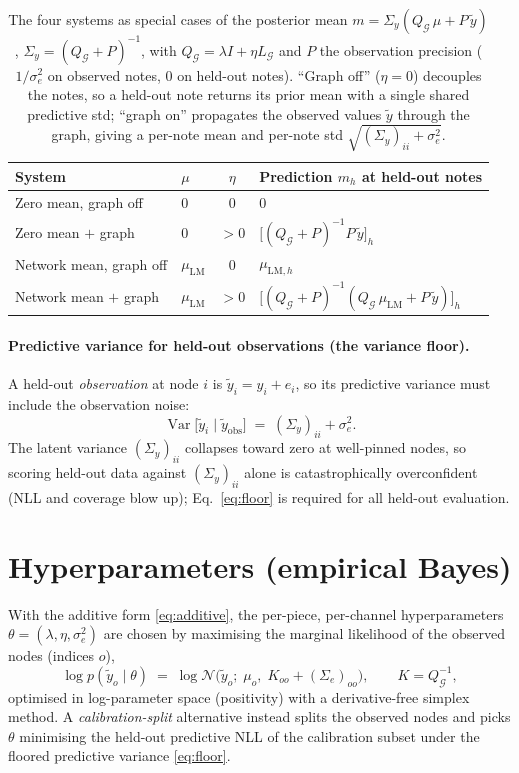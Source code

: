 \documentclass[11pt,a4paper]{report}
\newcommand{\N}{\mathcal{N}}
\newcommand{\graph}{\mathcal{G}}
\newcommand{\Qg}{Q_{\graph}}
\newcommand{\Lg}{L_{\graph}}
\newcommand{\muLM}{\mu_{\mathrm{LM}}}  %
\newcommand{\Sy}{\Sigma_y}             %
\begin{document}
\begin{table}[h]\centering
\caption{The four systems as special cases of the posterior mean
$m = \Sy(\Qg\,\mu + P\,\tilde y)$, $\Sy = (\Qg + P)^{-1}$, with
$\Qg = \lambda I + \eta\Lg$ and $P$ the observation precision ($1/\sigma_e^2$ on
observed notes, $0$ on held-out notes). ``Graph off'' ($\eta = 0$) decouples the
notes, so a held-out note returns its prior mean with a single shared predictive
std; ``graph on'' propagates the observed values $\tilde y$ through the graph,
giving a per-note mean and per-note std $\sqrt{(\Sy)_{ii} + \sigma_e^2}$.}
\label{tab:system-posteriors}
\begin{tabular}{@{}llcl@{}}
\toprule
System & $\mu$ & $\eta$ & Prediction $m_h$ at held-out notes \\
\midrule
Zero mean, graph off     & $0$     & $0$   & $0$ \\
Zero mean $+$ graph      & $0$     & $>0$  & $\bigl[(\Qg+P)^{-1}P\,\tilde y\bigr]_h$ \\
Network mean, graph off  & $\muLM$ & $0$   & $\mu_{\mathrm{LM},h}$ \\
Network mean $+$ graph    & $\muLM$ & $>0$  & $\bigl[(\Qg+P)^{-1}(\Qg\,\muLM+P\,\tilde y)\bigr]_h$ \\
\bottomrule
\end{tabular}
\end{table}

\paragraph{Predictive variance for held-out observations (the variance floor).}
A held-out \emph{observation} at node $i$ is $\tilde y_i = y_i + e_i$, so its
predictive variance must include the observation noise:
\begin{equation}
  \operatorname{Var}\bigl[\tilde y_i \mid \tilde y_{\mathrm{obs}}\bigr]
  \;=\; (\Sy)_{ii} + \sigma_e^2 .
  \label{eq:floor}
\end{equation}
The latent variance $(\Sy)_{ii}$ collapses toward zero at well-pinned nodes, so
scoring held-out data against $(\Sy)_{ii}$ alone is catastrophically overconfident
(NLL and coverage blow up); Eq.~\eqref{eq:floor} is required for all held-out
evaluation.

\section{Hyperparameters (empirical Bayes)}
\label{sec:eb}
With the additive form \eqref{eq:additive}, the per-piece, per-channel
hyperparameters $\theta = (\lambda, \eta, \sigma_e^2)$ are chosen by maximising the
marginal likelihood of the observed nodes (indices $o$),
\begin{equation}
  \log p(\tilde y_o \mid \theta)
  \;=\; \log \N\bigl(\tilde y_o;\; \mu_o,\; K_{oo} + (\Sigma_e)_{oo}\bigr),
  \qquad K = \Qg^{-1},
  \label{eq:marglik}
\end{equation}
optimised in log-parameter space (positivity) with a derivative-free simplex
method. A \emph{calibration-split} alternative instead splits the observed nodes and
picks $\theta$ minimising the held-out predictive NLL of the calibration subset
under the floored predictive variance \eqref{eq:floor}.
\end{document}
